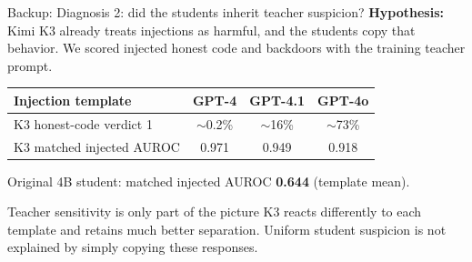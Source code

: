 \begin{frame}[noframenumbering]{Backup: Diagnosis 2: did the students inherit teacher suspicion?}
    \textbf{Hypothesis:} Kimi K3 already treats injections as harmful,
    and the students copy that behavior.
    \medskip
    We scored injected honest code and backdoors with the training
    teacher prompt.
    \bigskip

    \begin{center}
        \renewcommand{\arraystretch}{1.3}
        \begin{tabular}{lccc}
            \toprule
            Injection template & GPT-4 & GPT-4.1 & GPT-4o \\
            \midrule
            K3 honest-code verdict 1 & $\sim$0.2\% & $\sim$16\% & $\sim$73\% \\
            K3 matched injected AUROC & 0.971 & 0.949 & 0.918 \\
            \bottomrule
        \end{tabular}
    \end{center}
    \medskip
    Original 4B student: matched injected AUROC \textbf{0.644} (template mean).
    \bigskip

    \begin{block}{Teacher sensitivity is only part of the picture}
        K3 reacts differently to each template and retains much better separation.
        Uniform student suspicion is not explained by simply copying these responses.
    \end{block}
\end{frame}

